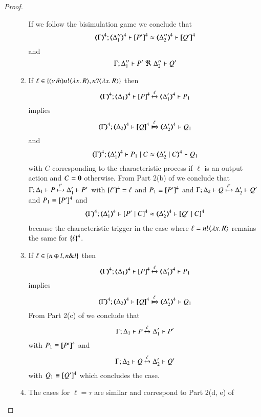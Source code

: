 \begin{proof}
\begin{itemize}
\begin{enumerate}
		If we follow the bisimulation game we conclude that
		\[
		\horel{\tmap{\Gamma}{4}}{\tmap{\Delta_1''}{4}}{\pmap{P'}{4}}{\wb}{\tmap{\Delta_2''}{4}}{\pmap{Q'}{4}}
		\]
		and
		\[
		\horel{\Gamma}{\Delta_1''}{P'}{\ \Re\ }{\Delta_2''}{Q'}
		\]
		\item	If $\ell \in \{(\nu\, \tilde{m}) n ! \langle \lambda x.\,R \rangle, n ? \langle \lambda x.\,R \rangle\}$
				then
				\[
				\horel{\tmap{\Gamma}{4}}{\tmap{\Delta_1}{4}}{\pmap{P}{4}}{\hby{\ell}}{\tmap{\Delta_1'}{4}}{P_1}
				\]
				implies
				\[
				\horel{\tmap{\Gamma}{4}}{\tmap{\Delta_2}{4}}{\pmap{Q}{4}}{\Hby{\ell}}{\tmap{\Delta_2'}{4}}{Q_1}
				\]
				and
				\[
				\horel{\tmap{\Gamma}{4}}{\tmap{\Delta_1'}{4}}{P_1 \Par C}{\wb}{\tmap{\Delta_2' \Par C}{4}}{Q_1}
				\]
				with $C$ corresponding to the characteristic process if $\ell$ is an output action and $C = \mathbf{0}$ otherwise.
				From Part 2(b) of  we conclude that
				$\Gamma; \Delta_1 \vdash P \xmapsto{\ell'} \Delta_1' \vdash P'$
				with $\{\!\!\{\ell'\}\!\!\}^{4} = \ell$ and $P_1 \equiv [\!\![P']\!\!]^4$
				and
				$\Gamma; \Delta_2 \vdash Q \xmapsto{\ell'} \Delta_2' \vdash Q'$
				and $P_1 \equiv [\!\![P']\!\!]^4$ and
				\begin{eqnarray*}
					\horel{\tmap{\Gamma}{4}}{\tmap{\Delta_1'}{4}}{\pmap{P' \Par C}{4}}{\wb}{\tmap{\Delta_2'}{4}}{\pmap{Q' \Par C}{4}}
				\end{eqnarray*}
				because the characteristic trigger in the case where $\ell = n ! \langle \lambda x.\,R \rangle$ remains the same
				for $\{\!\!\{\ell\}\!\!\}^{4}$.
				
		\item	If $\ell \in \{n \oplus l, n \& l\}$
				then
				\[
				\horel{\tmap{\Gamma}{4}}{\tmap{\Delta_1}{4}}{\pmap{P}{4}}{\hby{\ell}}{\tmap{\Delta_1'}{4}}{P_1}
				\]
				implies
				\[
				\horel{\tmap{\Gamma}{4}}{\tmap{\Delta_2}{4}}{\pmap{Q}{4}}{\Hby{\ell}}{\tmap{\Delta_2'}{4}}{Q_1}
				\]
				From Part 2(c) of  we conclude that
				\[	
				\Gamma; \Delta_1 \vdash P \xmapsto{\ell} \Delta_1' \vdash P'
				\]
				with $P_1 \equiv [\!\![P']\!\!]^4$
				and
				\[	
				\Gamma; \Delta_2 \vdash Q \xmapsto{\ell} \Delta_2' \vdash Q'
				\]
				with $Q_1 \equiv [\!\![Q']\!\!]^4$
				which concludes the case.

		\item	The cases for $\ell = \tau$ are similar
				and correspond to Part 2(d, e) of  
	\end{enumerate}
			

\end{itemize}
\end{proof}
